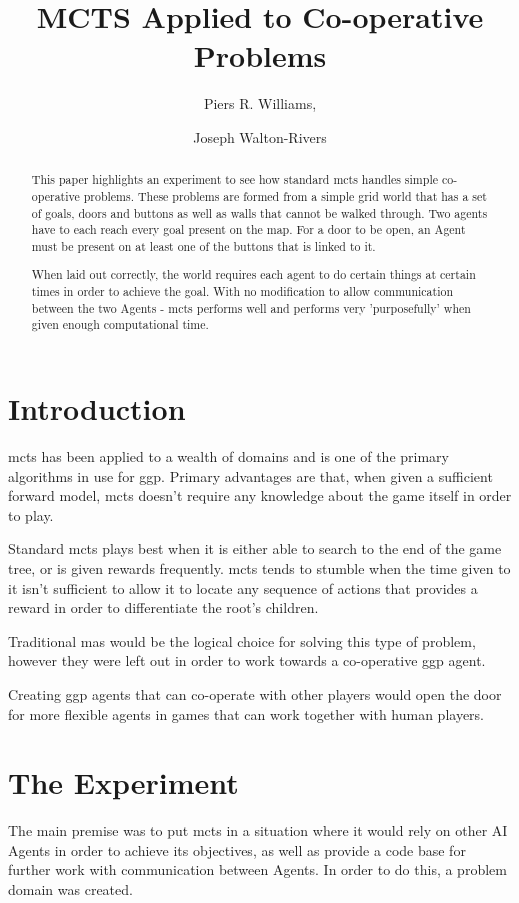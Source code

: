 \documentclass{IEEEtran}
\author{Piers R. Williams, \and Joseph Walton-Rivers}
\title{MCTS Applied to Co-operative Problems}
\begin{document}
\maketitle
\begin{abstract}
This paper highlights an experiment to see how standard \gls{mcts} handles simple co-operative problems.	These problems are formed from a simple grid world that has a set of goals, doors and buttons as well as walls that cannot be walked through. Two agents have to each reach every goal present on the map. For a door to be open, an Agent must be present on at least one of the buttons that is linked to it.

When laid out correctly, the world requires each agent to do certain things at certain times in order to achieve the goal. With no modification to allow communication between the two Agents - \gls{mcts} performs well and performs very 'purposefully' when given enough computational time.
\end{abstract}

\section{Introduction}

\gls{mcts} has been applied to a wealth of domains and is one of the primary algorithms in use for \gls{ggp}\cite{finnsson2008simulation}. Primary advantages are that, when given a sufficient forward model, \gls{mcts} doesn't require any knowledge about the game itself in order to play.

Standard \gls{mcts} plays best when it is either able to search to the end of the game tree, or is given rewards frequently. \gls{mcts} tends to stumble when the time given to it isn't sufficient to allow it to locate any sequence of actions that provides a reward in order to differentiate the root's children.

Traditional \gls{mas} would be the logical choice for solving this type of problem, however they were left out in order to work towards a co-operative \gls{ggp} agent.

Creating \gls{ggp} agents that can co-operate with other players would open the door for more flexible agents in games that can work together with human players. 
\section{The Experiment}
The main premise was to put \gls{mcts} in a situation where it would rely on other AI Agents in order to achieve its objectives, as well as provide a code base for further work with communication between Agents. In order to do this, a problem domain was created.
\end{document}

